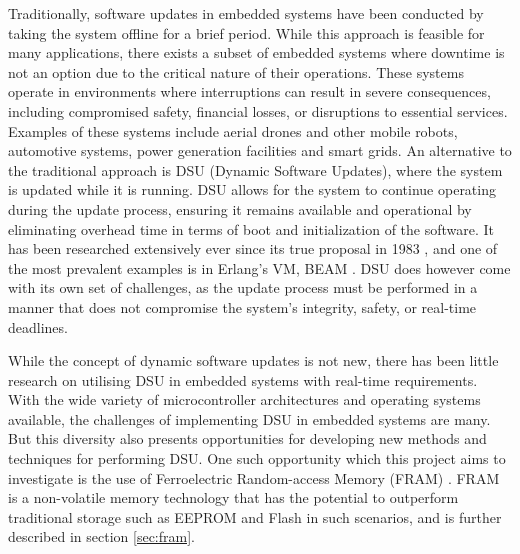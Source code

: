 Traditionally, software updates in embedded systems have been conducted by taking the system offline for a brief period. While this approach is feasible for many applications, there exists a subset of embedded systems where downtime is not an option due to the critical nature of their operations. These systems operate in environments where interruptions can result in severe consequences, including compromised safety, financial losses, or disruptions to essential services. Examples of these systems include aerial drones and other mobile robots, automotive systems, power generation facilities and smart grids. An alternative to the traditional approach is DSU (Dynamic Software Updates), where the system is updated while it is running. DSU allows for the system to continue operating during the update process, ensuring it remains available and operational by eliminating overhead time in terms of boot and initialization of the software. It has been researched extensively ever since its true proposal in 1983 \cite{dymos}, and one of the most prevalent examples is in Erlang's VM, BEAM \cite{erlangBook}.  DSU does however come with its own set of challenges, as the update process must be performed in a manner that does not compromise the system's integrity, safety, or real-time deadlines.

While the concept of dynamic software updates is not new, there has been little research on utilising DSU in embedded systems with real-time requirements. With the wide variety of microcontroller architectures and operating systems available, the challenges of implementing DSU in embedded systems are many. But this diversity also presents opportunities for developing new methods and techniques for performing DSU. One such opportunity which this project aims to investigate is the use of Ferroelectric Random-access Memory (FRAM) \cite{framOverview}. FRAM is a non-volatile memory technology that has the potential to outperform traditional storage such as EEPROM and Flash in such scenarios, and is further described in section \ref{sec:fram}.

